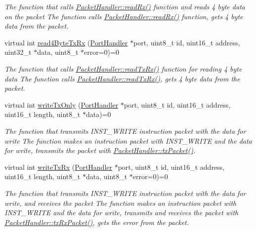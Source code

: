 \begin{DoxyCompactItemize}
\begin{DoxyCompactList}\small\item\em The function that calls \hyperlink{classmercury_1_1_packet_handler_a0857bd487c48ea83fc2b93e1e3e80200}{Packet\+Handler\+::read\+Rx()} function and reads 4 byte data on the packet  The function calls \hyperlink{classmercury_1_1_packet_handler_a0857bd487c48ea83fc2b93e1e3e80200}{Packet\+Handler\+::read\+Rx()} function,  gets 4 byte data from the packet. \end{DoxyCompactList}\item 
virtual int \hyperlink{classmercury_1_1_packet_handler_a92d8e5c9d5a0ed26dc5ba3cd78c3b636}{read4\+Byte\+Tx\+Rx} (\hyperlink{classmercury_1_1_port_handler}{Port\+Handler} $\ast$port, uint8\+\_\+t id, uint16\+\_\+t address, uint32\+\_\+t $\ast$data, uint8\+\_\+t $\ast$error=0)=0
\begin{DoxyCompactList}\small\item\em The function that calls \hyperlink{classmercury_1_1_packet_handler_ac743a57bba9e71aadb1578f0e704f166}{Packet\+Handler\+::read\+Tx\+Rx()} function for reading 4 byte data  The function calls \hyperlink{classmercury_1_1_packet_handler_ac743a57bba9e71aadb1578f0e704f166}{Packet\+Handler\+::read\+Tx\+Rx()},  gets 4 byte data from the packet. \end{DoxyCompactList}\item 
virtual int \hyperlink{classmercury_1_1_packet_handler_acf4e01987186250221603f794e7e4b59}{write\+Tx\+Only} (\hyperlink{classmercury_1_1_port_handler}{Port\+Handler} $\ast$port, uint8\+\_\+t id, uint16\+\_\+t address, uint16\+\_\+t length, uint8\+\_\+t $\ast$data)=0
\begin{DoxyCompactList}\small\item\em The function that transmits I\+N\+S\+T\+\_\+\+W\+R\+I\+TE instruction packet with the data for write  The function makes an instruction packet with I\+N\+S\+T\+\_\+\+W\+R\+I\+TE and the data for write,  transmits the packet with \hyperlink{classmercury_1_1_packet_handler_acc3f84f0d952dc2d827d8500de512abe}{Packet\+Handler\+::tx\+Packet()}. \end{DoxyCompactList}\item 
virtual int \hyperlink{classmercury_1_1_packet_handler_adf35a5000d465bd5426530e34a91a21d}{write\+Tx\+Rx} (\hyperlink{classmercury_1_1_port_handler}{Port\+Handler} $\ast$port, uint8\+\_\+t id, uint16\+\_\+t address, uint16\+\_\+t length, uint8\+\_\+t $\ast$data, uint8\+\_\+t $\ast$error=0)=0
\begin{DoxyCompactList}\small\item\em The function that transmits I\+N\+S\+T\+\_\+\+W\+R\+I\+TE instruction packet with the data for write, and receives the packet  The function makes an instruction packet with I\+N\+S\+T\+\_\+\+W\+R\+I\+TE and the data for write,  transmits and receives the packet with \hyperlink{classmercury_1_1_packet_handler_ac7ceeaec210827d119199144badaad3a}{Packet\+Handler\+::tx\+Rx\+Packet()},  gets the error from the packet. \end{DoxyCompactList}\item 

\end{DoxyCompactItemize}
